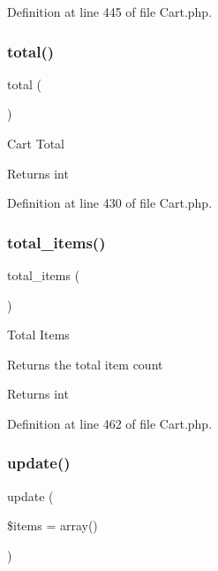 Definition at line 445 of file Cart.\+php.

\mbox{\label{class_c_i___cart_a9efa17b570797933c7c5b0c68f743a55}} 
\subsubsection{\texorpdfstring{total()}{total()}}
{\footnotesize\ttfamily total (\begin{DoxyParamCaption}{ }\end{DoxyParamCaption})}

Cart Total

\begin{DoxyReturn}{Returns}
int 
\end{DoxyReturn}


Definition at line 430 of file Cart.\+php.

\mbox{\label{class_c_i___cart_a785be13903ee65b8936d523b2728e53a}} 
\subsubsection{\texorpdfstring{total\_items()}{total\_items()}}
{\footnotesize\ttfamily total\+\_\+items (\begin{DoxyParamCaption}{ }\end{DoxyParamCaption})}

Total Items

Returns the total item count

\begin{DoxyReturn}{Returns}
int 
\end{DoxyReturn}


Definition at line 462 of file Cart.\+php.

\mbox{\label{class_c_i___cart_adddf5d1a4f704b647f28b0322f8b64f2}} 
\subsubsection{\texorpdfstring{update()}{update()}}
{\footnotesize\ttfamily update (\begin{DoxyParamCaption}\item[{}]{\$items = {\ttfamily array()} }\end{DoxyParamCaption})}

